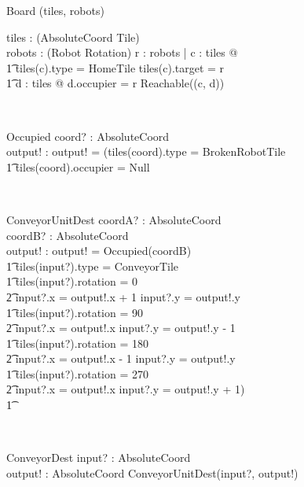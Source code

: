 \documentclass[12pt]{article}
\begin{document}
\begin{class}{Board}
\upharpoonright (tiles, robots) \\
\begin{state}
tiles : \power (AbsoluteCoord \fun Tile) \\
robots : \power (Robot \fun Rotation)
\where
\forall r : robots | \exists c : \dom tiles @  \\ \t1 tiles(c).type = HomeTile \wedge tiles(c).target = r \wedge \\ \t1
\exists d : \dom tiles @ d.occupier = r \wedge Reachable((c, d))
\end{state} \\
\begin{schema}{Occupied}
coord? : AbsoluteCoord \\
output! : \bool
\where
output! = (tiles(coord).type = BrokenRobotTile \; \; \vee \\ \t1
tiles(coord).occupier \not = Null
\end{schema} \\
\begin{schema}{ConveyorUnitDest}
coordA? : AbsoluteCoord \\
coordB? : AbsoluteCoord \\
output! : \bool
\where
output! = \neg Occupied(coordB) \\ \t1
        tiles(input?).type = ConveyorTile \\ \t1
        tiles(input?).rotation = 0 \Rightarrow \\ \t2 input?.x = output!.x + 1 \wedge input?.y = output!.y \\ \t1
        tiles(input?).rotation = 90 \Rightarrow \\ \t2 input?.x = output!.x \wedge input?.y = output!.y - 1 \\ \t1
        tiles(input?).rotation = 180 \Rightarrow \\ \t2 input?.x = output!.x - 1 \wedge input?.y = output!.y \\ \t1
        tiles(input?).rotation = 270 \Rightarrow \\ \t2 input?.x = output!.x \wedge input?.y = output!.y + 1) \\ \t1
\end{schema} \\
\znewpage
\begin{schema}{ConveyorDest}
input? : AbsoluteCoord \\
output! : AbsoluteCoord
\where
\IF ConveyorUnitDest(input?, output!) \\

\end{schema}
\end{class}
\end{document}
